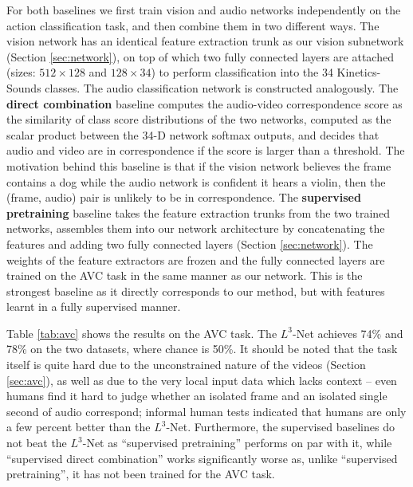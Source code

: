 \documentclass[10pt,twocolumn,letterpaper]{article}
\renewcommand{\paragraph}[1]{\smallskip\noindent{\bf{#1}}}
\begin{document}
\paragraph{Supervised baselines.}
For both baselines we first train vision and audio networks independently
on the action classification task, and then combine them in two different ways.
The vision network has an identical feature extraction trunk as our vision
subnetwork (Section \ref{sec:network}),
on top of which two fully connected layers
are attached (sizes: $512 \times 128$ and $128 \times 34$) to perform
classification into the 34 Kinetics-Sounds classes.
The audio classification network is constructed analogously.
The {\bf direct combination} baseline computes the audio-video correspondence
score as the similarity of class score distributions of the two networks,
computed as the scalar product between the 34-D network softmax outputs,
and decides that audio and video are in correspondence if the score is larger
than a threshold.
The motivation behind this baseline is that if the vision network believes the
frame contains a dog while the audio network is confident it hears a violin,
then the (frame, audio) pair is unlikely to be in correspondence.
The {\bf supervised pretraining} baseline takes the feature extraction
trunks from the two trained networks, assembles them into our network
architecture by concatenating the features and adding two fully connected
layers (Section \ref{sec:network}). The weights of the feature extractors
are frozen and the fully connected layers are trained on the AVC task
in the same manner as our network.
This is the strongest baseline as it directly corresponds to our method,
but with features learnt in a fully supervised manner.

\tabAvc
\paragraph{Results and discussion.}
Table \ref{tab:avc} shows the results on the AVC task.
The $L^3$-Net achieves 74\% and 78\% on the two datasets, where chance is 50\%.
It should be noted that the task itself is quite hard due to the
unconstrained nature of the videos (Section \ref{sec:avc}),
as well as due to the very local input data which lacks context --
even humans find it hard to judge whether an isolated frame and
an isolated single second of audio correspond;
informal human tests indicated that humans are only a few percent better than the $L^3$-Net.
Furthermore, the supervised baselines do not beat the $L^3$-Net
as ``supervised pretraining'' performs on par with it, while
``supervised direct combination'' works significantly worse
as, unlike ``supervised pretraining'', it has not been trained for the AVC task.
\end{document}

